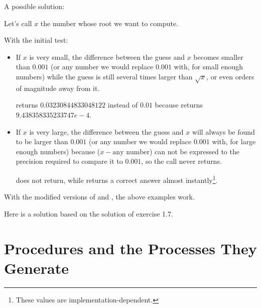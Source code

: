 \begin{exe}[1.7]
    A possible solution:

    Let's call $x$ the number whose root we want to compute.

    With the initial  test:
    \begin{itemize}
        \item If $x$ is very small, the difference between the guess and $x$ 
        becomes smaller than $0.001$ (or any number we would replace $0.001$ 
        with, for small enough numbers) while the guess is still several times 
        larger than $\sqrt{x}$, or even orders of magnitude away from it.
        \begin{example}
             returns $0.03230844833048122$ instead of $0.01$ 
            because\linebreak
            returns\linebreak
            $9.438358335233747e-4$.
        \end{example}
    \item If $x$ is very large, the difference between the guess and $x$ will 
        always be found to be larger than $0.001$ (or any number we would 
        replace $0.001$ with, for large enough numbers) because
        ($x - \text{any number}$) can not be expressed to the precision required 
        to compare it to $0.001$, so the call never returns.
        \begin{example}
             does not return, while  
            returns a correct answer almost instantly\footnote{These values are 
            implementation-dependent.}.
        \end{example}
    \end{itemize}

    With the modified versions of  and , the 
    above examples work.
\end{exe}

\begin{exe}[1.8]
    Here is a solution based on the solution of exercise 1.7.
\end{exe}

\section{Procedures and the Processes They Generate}

